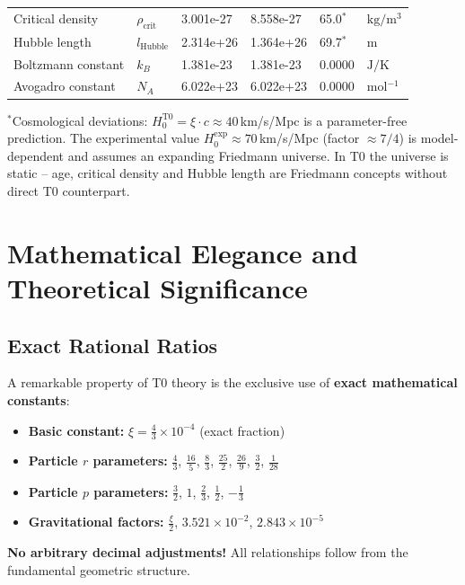 \documentclass[12pt,a4paper]{report}
\begin{document}
\begin{longtable}{>{\raggedright}p{4.0cm}p{1.2cm}p{1.8cm}p{2.0cm}p{1.6cm}p{2.0cm}}
		Critical density & $\rho_{\text{crit}}$ & 3.001e-27 & 8.558e-27 & 65.0$^*$ & $\si{\kilogram \per \meter^3}$ \\
		Hubble length & $l_{\text{Hubble}}$ & 2.314e+26 & 1.364e+26 & 69.7$^*$ & $\si{\meter}$ \\
		Boltzmann constant & $k_B$ & 1.381e-23 & 1.381e-23 & 0.0000 & $\si{\joule \per \kelvin}$ \\
		Avogadro constant & $N_A$ & 6.022e+23 & 6.022e+23 & 0.0000 & $\si{\mole^{-1}}$ \\
	\end{longtable}
	\normalsize
	
	{\small $^*$Cosmological deviations: $H_0^{\text{T0}} = \xi \cdot c \approx 40\,$km/s/Mpc is a parameter-free prediction. The experimental value $H_0^{\text{exp}} \approx 70\,$km/s/Mpc (factor $\approx 7/4$) is model-dependent and assumes an expanding Friedmann universe. In T0 the universe is static -- age, critical density and Hubble length are Friedmann concepts without direct T0 counterpart.}
	
	\section{Mathematical Elegance and Theoretical Significance}
	
	\subsection{Exact Rational Ratios}
	
	A remarkable property of T0 theory is the exclusive use of \textbf{exact mathematical constants}:
	
	\begin{itemize}
		\item \textbf{Basic constant:} $\xi = \frac{4}{3} \times 10^{-4}$ (exact fraction)
		\item \textbf{Particle $r$ parameters:} $\frac{4}{3}$, $\frac{16}{5}$, $\frac{8}{3}$, $\frac{25}{2}$, $\frac{26}{9}$, $\frac{3}{2}$, $\frac{1}{28}$
		\item \textbf{Particle $p$ parameters:} $\frac{3}{2}$, $1$, $\frac{2}{3}$, $\frac{1}{2}$, $-\frac{1}{3}$
		\item \textbf{Gravitational factors:} $\frac{\xi}{2}$, $3.521 \times 10^{-2}$, $2.843 \times 10^{-5}$
	\end{itemize}
	
	\textcolor{t0green}{\textbf{No arbitrary decimal adjustments!}} All relationships follow from the fundamental geometric structure.
	
\end{document}
